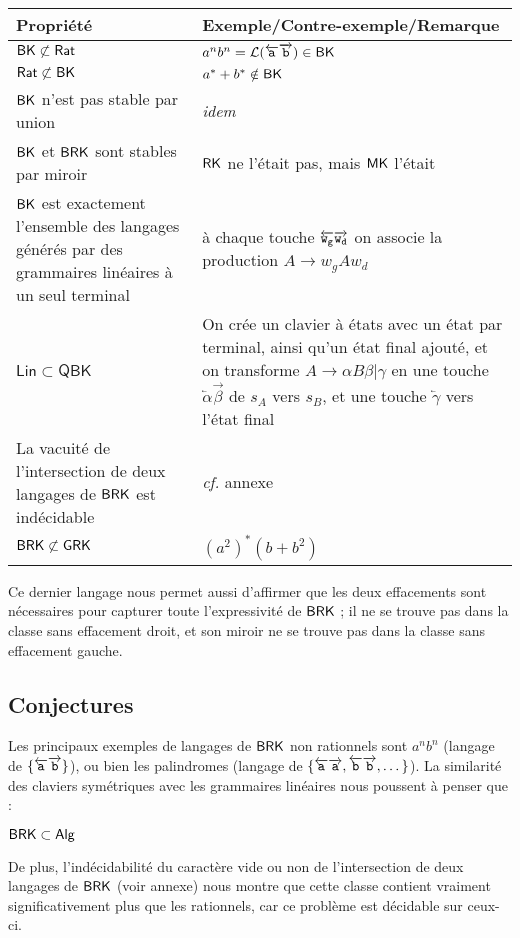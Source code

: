 \documentclass[12pt, a4paper]{article}
\renewcommand{\L}{\mathcal{L}}
\begin{document}
    \begin{tabular}{|p{}|p{}|}
        \hline
        \textbf{Propriété} & \textbf{Exemple/Contre-exemple/Remarque} \\
        \hline
        $\mathsf{BK} \not\subset \mathsf{Rat}$ & $a^nb^n = \L({\egauche{a}\edroite{b}}) \in \BK$ \\
        \hline
        $\mathsf{Rat} \not\subset \mathsf{BK}$ & $a^*+b^* \notin \mathsf{BK}$ \\
        \hline
        $\mathsf{BK}$ n'est pas stable par union & \textit{idem} \\
        \hline
        $\mathsf{BK}$ et $\mathsf{BRK}$ sont stables par miroir & $\mathsf{RK}$ ne l'était pas, mais $\mathsf{MK}$ l'était \\
        \hline
        $\mathsf{BK}$ est exactement l'ensemble des langages générés par des grammaires linéaires à un seul terminal & à chaque touche $\overleftarrow{\mathtt{w_g}}\overrightarrow{\mathtt{w_d}}$ on associe la production $A \rightarrow w_gAw_d$ \\
        \hline
        $\mathsf{Lin} \subset \mathsf{QBK}$ & On crée un clavier à états avec un état par terminal, ainsi qu'un état final ajouté, et on transforme $A \rightarrow \alpha B \beta | \gamma$ en une touche $\overleftarrow{\alpha}\overrightarrow{\beta}$ de $s_A$ vers $s_B$, et une touche $\overleftarrow{\gamma}$ vers l'état final \\
        \hline
        La vacuité de l'intersection de deux langages de $\mathsf{BRK}$ est indécidable & \textit{cf.} annexe \\
        \hline
        $\mathsf{BRK} \not\subset \mathsf{GRK}$ & $(a^2)^*(b+b^2)$ \\
        \hline
    \end{tabular}

    
    Ce dernier langage nous permet aussi d'affirmer que les deux effacements sont nécessaires pour capturer toute l'expressivité de $\mathsf{BRK}$ ; il ne se trouve pas dans la classe sans effacement droit, et son miroir ne se trouve pas dans la classe sans effacement gauche.

         
    \subsection{Conjectures}\label{sectionclavsym}
    Les principaux exemples de langages de $\mathsf{BRK}$ non rationnels sont $a^nb^n$ (langage de $\{\overleftarrow{\mathtt{a}}\overrightarrow{\mathtt{b}}\}$), ou bien les palindromes (langage de $\{\overleftarrow{\mathtt{a}}\overrightarrow{\mathtt{a}},\overleftarrow{\mathtt{b}}\overrightarrow{\mathtt{b}}, \dots\}$). La similarité des claviers symétriques avec les grammaires linéaires nous poussent à penser que :
    \begin{example}[Conjecture 1]
        $\mathsf{BRK} \subset \mathsf{Alg}$
    \end{example}
    De plus, l'indécidabilité du caractère vide ou non de l'intersection de deux langages de $\mathsf{BRK}$ (voir annexe) nous montre que cette classe contient vraiment significativement plus que les rationnels, car ce problème est décidable sur ceux-ci.
    
\end{document}
